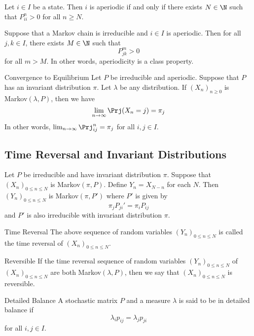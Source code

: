 \documentclass[a4paper]{article}
\begin{document}
\begin{prp} Let $i\in I$ be a state. Then $i$ is aperiodic if and only if there exists $N\in\N$ such that $P_{ii}^n>0$ for all $n\geq N$. 
\end{prp}

\begin{lmm}{}{} Suppose that a Markov chain is irreducible and $i\in I$ is aperiodic. Then for all $j,k\in I$, there exists $M\in\N$ such that $$P_{jk}^m>0$$ for all $m>M$. In other words, aperiodicity is a class property. 
\end{lmm}

\begin{thm}{Convergence to Equilibrium}{} Let $P$ be irreducible and aperiodic. Suppose that $P$ has an invariant distribution $\pi$. Let $\lambda$ be any distribution. If $(X_n)_{n\geq 0}$ is Markov$(\lambda,P)$, then we have $$\lim_{n\to\infty}\Prj(X_n=j)=\pi_j$$ In other words, $\lim_{n\to\infty}\Prj_{ij}^n=\pi_j$ for all $i,j\in I$. 
\end{thm}

\subsection{Time Reversal and Invariant Distributions}
\begin{thm}{}{} Let $P$ be irreducible and have invariant distribution $\pi$. Suppose that $(X_n)_{0\leq n\leq N}$ is Markov$(\pi,P)$. Define $Y_n=X_{N-n}$ for each $N$. Then $(Y_n)_{0\leq n\leq N}$ is Markov$(\pi,P')$ where $P'$ is given by $$\pi_jP_{ji}'=\pi_iP_{ij}$$ and $P'$ is also irreducible with invariant distribution $\pi$. 
\end{thm}

\begin{defn}{Time Reversal}{} The above sequence of random variables $(Y_n)_{0\leq n\leq N}$ is called the time reversal of $(X_n)_{0\leq n\leq N}$. 
\end{defn}

\begin{defn}{Reversible}{} If the time reversal sequence of random variables $(Y_n)_{0\leq n\leq N}$ of $(X_n)_{0\leq n\leq N}$ are both Markov$(\lambda,P)$, then we say that $(X_n)_{0\leq n\leq N}$ is reversible. 
\end{defn}

\begin{defn}{Detailed Balance}{} A stochastic matrix $P$ and a measure $\lambda$ is said to be in detailed balance if $$\lambda_ip_{ij}=\lambda_jp_{ji}$$ for all $i,j\in I$. 
\end{defn}
\end{document}
